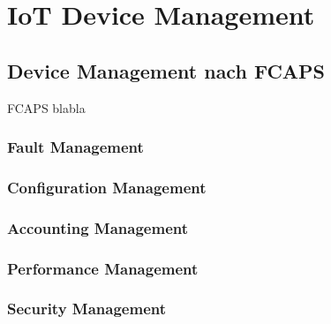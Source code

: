 \chapter{IoT Device Management}
\section{Device Management nach FCAPS}
FCAPS blabla
\subsection{Fault Management}
\subsection{Configuration Management}
\subsection{Accounting Management}
\subsection{Performance Management}
\subsection{Security Management}

\section{}




















